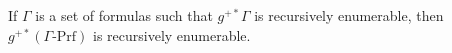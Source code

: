 If $\Gamma$ is a set of formulas such that $g^{+*} \Gamma$ is recursively enumerable, then $g^{+*}(\Gamma\text{-Prf})$ is recursively enumerable.
